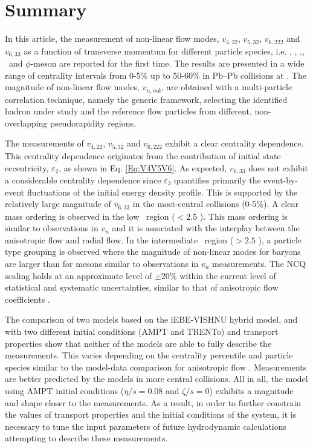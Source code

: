 \newpage

\section{Summary}
\label{Sec:conclusion}

In this article, the measurement of non-linear flow modes, $v_{4,22}$, $v_{5,32}$, $v_{6,222}$ and $v_{6,33}$ as a function of transverse momentum for different particle species, i.e. \pion, \kaon, \Ks,\proton, \lambdas~and $\phi$-meson are reported for the first time. The results are presented in a wide range of centrality intervals from 0-5\% up to 50-60\% in Pb--Pb collisions at \sNN. The magnitude of non-linear flow modes, $v_{n,mk}$, are obtained with a multi-particle correlation technique, namely the generic framework, selecting the identified hadron under study and the reference flow particles from different, non-overlapping pseudorapidity regions.  

The measurements of $v_{4,22}$, $v_{5,32}$ and $v_{6,222}$ exhibit a clear centrality dependence. This centrality dependence originates from the contribution of initial state eccentricity, $\varepsilon_{2}$, as shown in Eq. \ref{Eq:V4V5V6}. As expected, $v_{6,33}$ does not exhibit a considerable centrality dependence since $\varepsilon_{3}$ quantifies primarily the event-by-event fluctuations of the initial energy density profile. This is supported by the relatively large magnitude of $v_{6,33}$ in the most-central collisions (0-5\%). A clear mass ordering is observed in the low \pT~region (\pT$< 2.5$ \GeV). This mass ordering is similar to observations in $v_{n}$ and it is associated with the interplay between the anisotropic flow and radial flow. In the intermediate \pT~region (\pT$> 2.5$ \GeV), a particle type grouping is observed where the magnitude of non-linear modes for baryons are larger than for mesons similar to observations in $v_{n}$ measurements. The NCQ scaling holds at an approximate level of $\pm 20$\% within the current level of statistical and systematic uncertainties, similar to that of anisotropic flow coefficients \cite{Acharya:2018zuq}. 

The comparison of two models based on the iEBE-VISHNU hybrid model, and with two different initial conditions (AMPT and TRENTo) and transport properties show that neither of the models are able to fully describe the measurements. This varies depending on the centrality percentile and particle species similar to the model-data comparison for anisotropic flow \cite{Acharya:2018zuq}. Measurements are better predicted by the models in more central collisions. All in all, the model using AMPT initial conditions ($\eta/s = 0.08$ and $\zeta/s =0$) exhibits a magnitude and shape closer to the measurements. As a result, in order to further constrain the values of transport properties and the initial conditions of the system, it is necessary to tune the input parameters of future hydrodynamic calculations attempting to describe these measurements.
